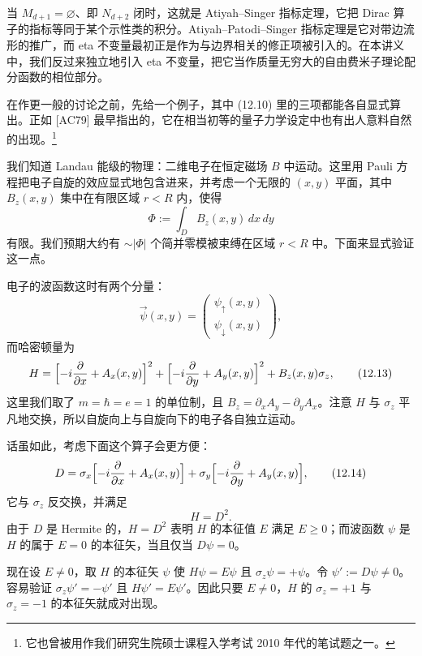 当 $M_{d+1}=\varnothing$、即 $N_{d+2}$ 闭时，这就是 Atiyah--Singer 指标定理，它把 Dirac 算子的指标等同于某个示性类的积分。Atiyah--Patodi--Singer 指标定理是它对带边流形的推广，而 eta 不变量最初正是作为与边界相关的修正项被引入的。在本讲义中，我们反过来独立地引入 eta 不变量，把它当作质量无穷大的自由费米子理论配分函数的相位部分。

在作更一般的讨论之前，先给一个例子，其中 (12.10) 里的三项都能各自显式算出。正如 [AC79] 最早指出的，它在相当初等的量子力学设定中也有出人意料自然的出现。\footnote{它也曾被用作我们研究生院硕士课程入学考试 2010 年代的笔试题之一。}

我们知道 Landau 能级的物理：二维电子在恒定磁场 $B$ 中运动。这里用 Pauli 方程把电子自旋的效应显式地包含进来，并考虑一个无限的 $(x,y)$ 平面，其中 $B_z(x,y)$ 集中在有限区域 $r<R$ 内，使得
\begin{equation}
  \Phi:=\int_D B_z(x,y)\,dx\,dy
  \tag{12.11}
\end{equation}
有限。我们预期大约有 $\sim|\Phi|$ 个简并零模被束缚在区域 $r<R$ 中。下面来显式验证这一点。

电子的波函数这时有两个分量：
\begin{equation}
  \vec\psi(x,y)=\begin{pmatrix}\psi_\uparrow(x,y)\\ \psi_\downarrow(x,y)\end{pmatrix},
  \tag{12.12}
\end{equation}
而哈密顿量为
\begin{equation}
  H=\Bigl[-i\frac{\partial}{\partial x}+A_x(x,y)\Bigr]^2
  +\Bigl[-i\frac{\partial}{\partial y}+A_y(x,y)\Bigr]^2
  +B_z(x,y)\sigma_z,
  \tag{12.13}
\end{equation}
这里我们取了 $m=\hbar=e=1$ 的单位制，且 $B_z=\partial_xA_y-\partial_yA_x$。注意 $H$ 与 $\sigma_z$ 平凡地交换，所以自旋向上与自旋向下的电子各自独立运动。

话虽如此，考虑下面这个算子会更方便：
\begin{equation}
  D=\sigma_x\Bigl[-i\frac{\partial}{\partial x}+A_x(x,y)\Bigr]
  +\sigma_y\Bigl[-i\frac{\partial}{\partial y}+A_y(x,y)\Bigr],
  \tag{12.14}
\end{equation}
它与 $\sigma_z$ 反交换，并满足
\begin{equation}
  H=D^2.
  \tag{12.15}
\end{equation}
由于 $D$ 是 Hermite 的，$H=D^2$ 表明 $H$ 的本征值 $E$ 满足 $E\ge0$；而波函数 $\psi$ 是 $H$ 的属于 $E=0$ 的本征矢，当且仅当 $D\psi=0$。

现在设 $E\neq0$，取 $H$ 的本征矢 $\psi$ 使 $H\psi=E\psi$ 且 $\sigma_z\psi=+\psi$。令 $\psi':=D\psi\neq0$。容易验证 $\sigma_z\psi'=-\psi'$ 且 $H\psi'=E\psi'$。因此只要 $E\neq0$，$H$ 的 $\sigma_z=+1$ 与 $\sigma_z=-1$ 的本征矢就成对出现。

